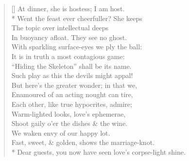 \documentclass[MAIN]{subfiles}
\begin{document}
\settowidth{\versewidth}{Dear guests, you now have seen love's corpse-light shine.}
\begin{verse}[\versewidth]
At dinner, she is hostess; I am host.\\*
\vin Went the feast ever cheerfuller? She keeps\\
\vin The topic over intellectual deeps\\
In buoyancy afloat. They see no ghost.\\
With sparkling surface-eyes we ply the ball:\\
\vin It is in truth a most contagious game:\\
\vin ``Hiding the Skeleton'' shall be its name.\\ 
Such play as this the devils might appal!\\
But here's the greater wonder; in that we,\\
\vin Enamoured of an acting nought can tire,\\
\vin Each other, like true hypocrites, admire;\\
Warm-lighted looks, love's ephemerae,\\
Shoot gaily o'er the dishes \& the wine.\\
\vin We waken envy of our happy lot.\\
\vin Fast, sweet, \& golden, shows the marriage-knot.\\*
Dear guests, you now have seen love's corpse-light shine.
\end{verse}
\end{document}
